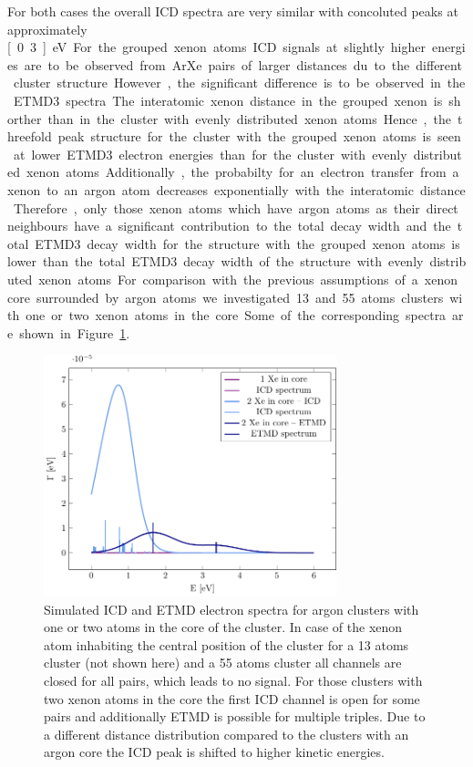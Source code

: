 For both cases the overall ICD spectra are very similar with concoluted
peaks at approximately \unit[0.3]{eV}. For the grouped xenon atoms ICD
signals at slightly higher energies are to be observed from ArXe pairs of
larger distances du to the different cluster structure. However, the
significant difference is to be observed in the ETMD3 spectra. The
interatomic xenon distance in the grouped xenon is shorther than in the
cluster with evenly distributed xenon atoms. Hence, the threefold
peak structure for the cluster with the grouped xenon atoms is seen at
lower ETMD3 electron energies than for the cluster with evenly
distributed xenon atoms. Additionally, the probabilty for an electron
transfer from a xenon to an argon atom decreases exponentially with the
interatomic distance. Therefore, only those xenon atoms which have argon
atoms as their direct neighbours have a significant contribution to the
total decay width and the total ETMD3 decay width for the structure with
the grouped xenon atoms is lower than the total ETMD3 decay width of
the structure with evenly distributed xenon atoms.


For comparison with the previous assumptions of a xenon core surrounded
by argon atoms we investigated 13 and 55 atoms clusters with one or two
xenon atoms in the core. Some of the corresponding
spectra are shown in Figure \ref{figure:xe_3_in}.

\begin{figure}[h]
 \centering
 \includegraphics[width=8.5cm]{pics/xe_3_in.pdf}
 \caption{Simulated ICD and ETMD electron spectra for argon clusters with
          one or two atoms in the core of the cluster. In case of the xenon
          atom inhabiting the central position of the cluster for a 13 atoms
          cluster (not shown here) and a 55 atoms cluster all channels are closed
          for all pairs, which leads to no signal. For those clusters with two
          xenon atoms in the core the first ICD channel is open for some pairs
          and additionally ETMD is possible for multiple triples. Due to a
          different distance distribution compared to the clusters with an argon
          core the ICD peak is shifted to higher kinetic energies.}
 \label{figure:xe_3_in}
\end{figure}

